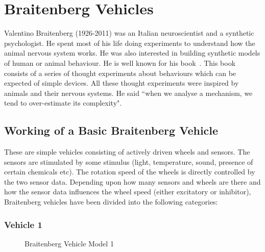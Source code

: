 \section{Braitenberg Vehicles}

    Valentino Braitenberg (1926-2011) was an Italian neuroscientist and a synthetic psychologist. He spent most of his life doing experiments to understand how the animal nervous system works. He was also interested in building synthetic models of human or animal behaviour. He is well known for his book~\cite{braitenberg1986vehicles}. This book consists of a series of thought experiments about behaviours which can be expected of simple devices. All these thought experiments were inspired by animals and their nervous systems. He said ``when we analyse a mechanism, we tend to over-estimate its complexity".

    \subsection{Working of a Basic Braitenberg Vehicle}
    These are simple vehicles consisting of actively driven wheels and sensors. The sensors are stimulated by some stimulus (light, temperature, sound, presence of certain chemicals etc). The rotation speed of the wheels is directly controlled by the two sensor data. Depending upon how many sensors and wheels are there and how the sensor data influences the wheel speed (either excitatory or inhibitor), Braitenberg vehicles have been divided into the following categories:



    \subsubsection{Vehicle 1}
    \label{sec:Vehicle_1}

        \begin{figure}[t]%
            \centering
            \qquad
            \caption{Braitenberg Vehicle Model 1}%
            \label{fig:vehicle1}%
        \end{figure}


